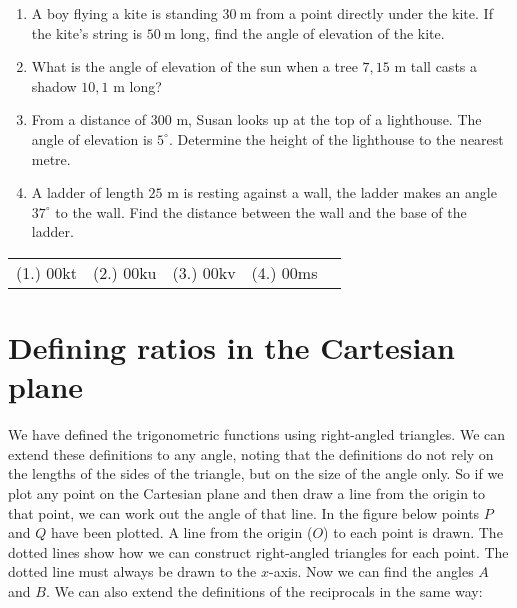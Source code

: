 \begin{exercises}{}
{
\begin{enumerate}[noitemsep, label=\textbf{\arabic*}. ] 

\item A boy flying a kite is standing $30~$m from a point directly under the kite. If the kite's string is $50~$m long, find the angle of elevation of the kite.
\item What is the angle of elevation of the sun when a tree $7,15$ m tall casts a shadow $10,1$ m long?
\item From a distance of $300$ m, Susan looks up at the top of a lighthouse. The angle of elevation is $5^{\circ}$. Determine the height of the lighthouse to the nearest metre.
\item A ladder of length $25$ m is resting against a wall, the ladder makes an angle $37^{\circ}$ to the wall. Find the distance between the wall and the base of the ladder. 

\end{enumerate}

\practiceinfo
\par 
\par \begin{tabular}[h]{ccccc}
(1.) 00kt&  (2.) 00ku& (3.) 00kv& (4.) 00ms \end{tabular}
    
}
\end{exercises} 

\section{Defining ratios in the Cartesian plane}

We have defined the trigonometric functions using right-angled
triangles. We can extend these definitions to any angle, noting that
the definitions do not rely on the lengths of the sides of the
triangle, but on the size of the angle only. So if we plot any point
on the Cartesian plane and then draw a line from the origin to that
point, we can work out the angle of that line. In the figure below
points $P$ and $Q$ have been plotted. A line from the origin ($O$) to
each point is drawn. The dotted lines show how we can construct
right-angled triangles for each point. The dotted line must always be
drawn to the $x$-axis. Now we can find the angles $A$ and $B$. We can
also extend the definitions of the reciprocals in the same way:


